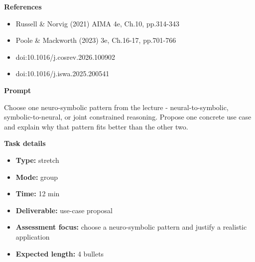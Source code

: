 \documentclass[11pt]{article}
\begin{document}
\begin{tcolorbox}[colback=white,colframe=MidnightBlue,title={Q5 Exam-Style Constructed Response},fonttitle=\bfseries,breakable]
{\large\bfseries\color{MidnightBlue} References}\par\medskip
\begin{itemize}\item Russell \& Norvig (2021) AIMA 4e, Ch.10, pp.314-343
\item Poole \& Mackworth (2023) 3e, Ch.16-17, pp.701-766
\item doi:10.1016/j.cosrev.2026.100902
\item doi:10.1016/j.iswa.2025.200541\end{itemize}
\end{tcolorbox}

\begin{tcolorbox}[colback=white,colframe=MidnightBlue,title={Q6 Stretch Extension},fonttitle=\bfseries,breakable]
\begin{center}
\end{center}

{\large\bfseries\color{MidnightBlue} Prompt}\par\medskip
Choose one neuro-symbolic pattern from the lecture - neural-to-symbolic, symbolic-to-neural, or joint constrained reasoning. Propose one concrete use case and explain why that pattern fits better than the other two.

{\large\bfseries\color{MidnightBlue} Task details}\par\medskip
\begin{itemize}\item \textbf{Type:} stretch
\item \textbf{Mode:} group
\item \textbf{Time:} 12 min
\item \textbf{Deliverable:} use-case proposal
\item \textbf{Assessment focus:} choose a neuro-symbolic pattern and justify a realistic application
\item \textbf{Expected length:} 4 bullets\end{itemize}


\end{tcolorbox}
\end{document}
